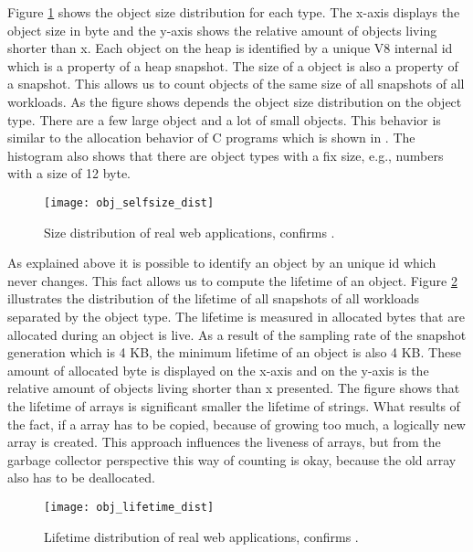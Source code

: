 Figure \ref{fig:obj_selfsize_dist} shows the object size distribution for each type. The x-axis displays the object size in byte and the y-axis shows the relative amount of objects living shorter than x. Each object on the \JS heap is identified by a unique V8 internal id which is a property of a heap snapshot. The size of a object is also a property of a snapshot. This allows us to count objects of the same size of all snapshots of all workloads. As the figure shows depends the object size distribution on the object type. There are a few large object and a lot of small objects. This behavior is similar to the allocation behavior of C programs which is shown in \cite{Aigner2013}. The histogram also shows that there are object types with a fix size, e.g., numbers with a size of 12 byte.
\begin{figure}
	\centering
	\texttt{[image: obj\_selfsize\_dist]}
	\caption{Size distribution of real web applications, confirms \cite{JSMeter2009}.}
	\label{fig:obj_selfsize_dist}
\end{figure}

As explained above it is possible to identify an object by an unique id which never changes. This fact allows us to compute the lifetime of an object. Figure \ref{fig:obj_lifetime_dist} illustrates the distribution of the lifetime of all snapshots of all workloads separated by the object type. The lifetime is measured in allocated bytes that are allocated during an object is live. As a result of the sampling rate of the snapshot generation which is 4 KB, the minimum lifetime of an object is also 4 KB. These amount of allocated byte is displayed on the x-axis and on the y-axis is the relative amount of objects living shorter than x presented. The figure shows that the lifetime of arrays is significant smaller the lifetime of strings. What results of the fact, if a array has to be copied, because of growing too much, a logically new array is created. This approach influences the liveness of arrays, but from the garbage collector perspective this way of counting is okay, because the old array also has to be deallocated.
\begin{figure}
	\centering
	\texttt{[image: obj\_lifetime\_dist]}
	\caption{Lifetime distribution of real web applications, confirms \cite{JSMeter2009}.}
	\label{fig:obj_lifetime_dist}
\end{figure}


